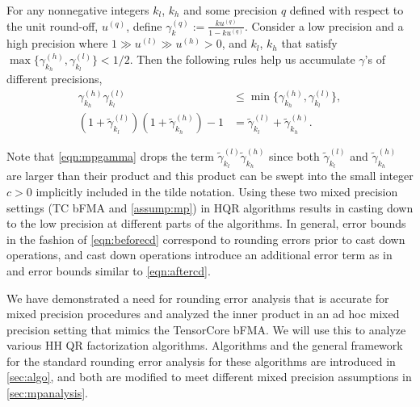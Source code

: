 \documentclass[review,onefignum,onetabnum]{siamart190516}
\begin{document}
\begin{lemma}\label{lem:mp}
	For any nonnegative integers $k_l$, $k_h$ and some precision $q$ defined with respect to the unit round-off, $u^{(q)}$, define $\gamma^{(q)}_{k} := \frac{k u^{(q)} }{1-ku^{(q)}}$.
	Consider a low precision and a high precision where $1 \gg u^{(l)} \gg u^{(h)}>0$, and $k_l$, $k_h$ that satisfy $\max\{\gamma^{(h)}_{k_{h}},\gamma^{(l)}_{k_{l}}\} < 1/2$.
	Then the following rules help us accumulate $\gamma$'s of different precisions,
	\begin{align}
	\gamma^{(h)}_{k_{h}}\gamma^{(l)}_{k_{l}} &\leq \min\{\gamma^{(h)}_{k_{h}},\gamma^{(l)}_{k_{l}} \},\\ 
	(1+\tilde{\gamma}_{k_l}^{(l)})(1+\tilde{\gamma}_{k_h}^{(h)}) -1 &= \tilde{\gamma}_{k_l}^{(l)}+\tilde{\gamma}_{k_h}^{(h)}. \label{eqn:mpgamma}
	\end{align}
\end{lemma}
Note that \cref{eqn:mpgamma} drops the term $\tilde{\gamma}_{k_l}^{(l)}\tilde{\gamma}_{k_h}^{(h)}$ since both $\tilde{\gamma}_{k_l}^{(l)}$ and $\tilde{\gamma}_{k_h}^{(h)}$ are larger than their product and this product can be swept into the small integer $c > 0$ implicitly included in the tilde notation.
Using these two mixed precision settings (TC bFMA and \cref{assump:mp}) in HQR algorithms results in casting down to the low precision at different parts of the algorithms.
In general, error bounds in the fashion of \cref{eqn:beforecd} correspond to rounding errors prior to cast down operations, and cast down operations introduce an additional error term as in and error bounds similar to \cref{eqn:aftercd}.\par

We have demonstrated a need for rounding error analysis that is accurate for mixed precision procedures and analyzed the inner product in an ad hoc mixed precision setting that mimics the TensorCore bFMA.
We will use this to analyze various HH QR factorization algorithms.
Algorithms and the general framework for the standard rounding error analysis for these algorithms are introduced in \cref{sec:algo}, and both are modified to meet different mixed precision assumptions in \cref{sec:mpanalysis}.
\end{document}
